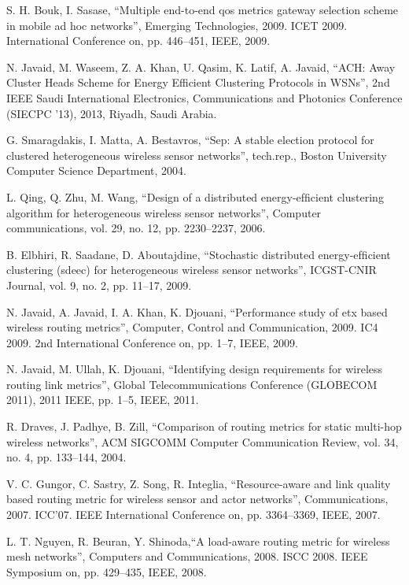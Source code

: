 \documentclass[journal]{IEEEtran}
\begin{document}
\begin{thebibliography}{1}
S. H. Bouk, I. Sasase, ``Multiple end-to-end qos metrics gateway selection scheme in mobile ad hoc networks'', Emerging Technologies, 2009. ICET 2009. International Conference on, pp. 446–451, IEEE, 2009.

N. Javaid, M. Waseem, Z. A. Khan, U. Qasim, K. Latif, A. Javaid, ``ACH: Away Cluster Heads Scheme for Energy Efficient Clustering Protocols in WSNs'', 2nd IEEE Saudi International Electronics, Communications and Photonics Conference (SIECPC ’13), 2013, Riyadh, Saudi Arabia.

G. Smaragdakis, I. Matta, A. Bestavros, ``Sep: A stable election protocol for clustered heterogeneous wireless sensor networks'', tech.rep., Boston University Computer Science Department, 2004.

L. Qing, Q. Zhu, M. Wang, ``Design of a distributed energy-efﬁcient clustering algorithm for heterogeneous wireless sensor networks'', Computer communications, vol. 29, no. 12, pp. 2230–2237, 2006.

B. Elbhiri, R. Saadane, D. Aboutajdine, ``Stochastic distributed energy-efﬁcient clustering (sdeec) for heterogeneous wireless sensor networks'', ICGST-CNIR Journal, vol. 9, no. 2, pp. 11–17, 2009.

N. Javaid, A. Javaid, I. A. Khan, K. Djouani, ``Performance study of etx based wireless routing metrics'', Computer, Control and Communication, 2009. IC4 2009. 2nd International Conference on, pp. 1–7, IEEE, 2009.

N. Javaid, M. Ullah, K. Djouani, ``Identifying design requirements for wireless routing link metrics'', Global Telecommunications Conference (GLOBECOM 2011), 2011 IEEE, pp. 1–5, IEEE, 2011.

R. Draves, J. Padhye, B. Zill, ``Comparison of routing metrics for static multi-hop wireless networks'', ACM SIGCOMM Computer Communication Review, vol. 34, no. 4, pp. 133–144, 2004.

V. C. Gungor, C. Sastry, Z. Song, R. Integlia, ``Resource-aware and link quality based routing metric for wireless sensor and actor networks'', Communications, 2007. ICC’07. IEEE International Conference on, pp. 3364–3369, IEEE, 2007.

L. T. Nguyen, R. Beuran, Y. Shinoda,``A load-aware routing metric for wireless mesh networks'', Computers and Communications, 2008. ISCC 2008. IEEE Symposium on, pp. 429–435, IEEE, 2008.

\end{thebibliography}
\end{document}
